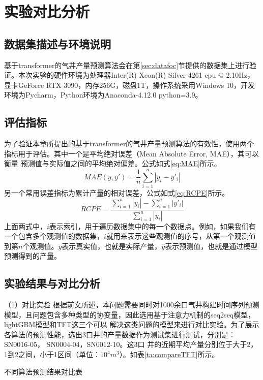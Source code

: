\section{实验对比分析}
\subsection{数据集描述与环境说明}
基于transformer的气井产量预测算法会在第\ref{sec:datafoc}节提供的数据集上进行验证。本次实验的硬件环境为处理器Inter(R) Xeon(R) Silver 4261 cpu @ 2.10Hz，
显卡GeForce RTX 3090，内存256G，磁盘1T，操作系统采用Windows 10，开发环境为Pycharm，Python环境为Anaconda-4.12.0 python=3.9。
\subsection{评估指标}
为了验证本章所提出的基于transformer的气井产量预测算法的有效性，使用两个指标用于评估。其中一个是平均绝对误差（Mean Absolute Error, MAE），其可以衡量
预测值与实际值之间的平均绝对偏差。公式如式\eqref{eq:MAE}所示。
\begin{equation}
    MAE(y, y') = \frac{1}{n} \sum_{i=1}^{n} |y_i - y'_i|
    \label{eq:MAE}
\end{equation}
另一个常用误差指标为累计产量的相对误差，公式如式\eqref{eq:RCPE}所示。
\begin{equation}
    RCPE = \frac{\sum_{i=1}^{n} |y_i| - \sum_{i=1}^{n} |y'_i|}{\sum_{i=1}^{n} |y_i|}
    \label{eq:RCPE}
\end{equation}
上面两式中，$i$表示索引，用于遍历数据集中的每一个数据点。例如，如果我们有一个包含多个观测值的数据集，$i$就用来表示这些观测值的序号，从第一个观测值
到第$n$个观测值。$y$表示真实值，也就是实际产量，$\hat{y}$表示预测值，也就是通过模型预测得到的产量。
\subsection{实验结果与对比分析}
（1）对比实验
根据前文所述，本问题需要同时对1000余口气井构建时间序列预测模型，且问题包含多种类型的协变量，因此选用基于注意力机制的seq2seq模型，lightGBM模型和TFT这三个可以
解决这类问题的模型来进行对比实验。为了展示各算法的预测性能，选出3口井的产量数据作为测试集进行测试，分别是：SN0016-05， SN0004-04，SN0012-10。这3口
井的近期平均产量分别位于大于2，1到2之间，小于1区间（单位：$10^4m^3$）。如表\ref{ta:compareTFT}所示。
\begin{table}[H]
    \centering
    \caption{不同算法预测结果对比表}

\end{table}
